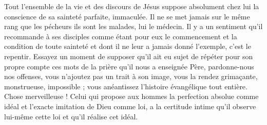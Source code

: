 Tout l’ensemble de la vie et des discours de Jésus suppose absolument chez lui la conscience de sa sainteté parfaite, immaculée.
Il ne se met jamais sur le même rang que les pécheurs\frcolon{} ils sont les malades, lui le médecin.
Il y a un sentiment qu’il recommande à ses disciples comme étant pour eux le commencement et la condition de toute sainteté et dont il ne leur a jamais donné l’exemple, c’est le repentir. Essayez un moment de supposer qu’il ait eu sujet de répéter pour son propre compte ces mots de la prière qu’il nous a enseignée\frcolon{} \Og{} Père, pardonne-nous nos offenses\Fg{}, vous n’ajoutez pas un trait à son image, vous la rendez grimaçante, monstrueuse, impossible ; vous anéantissez l’histoire évangélique tout entière. Chose merveilleuse ! Celui qui propose aux hommes la perfection absolue comme idéal et l’exacte imitation de Dieu comme loi, a la certitude intime qu’il observe lui-même cette loi et qu’il réalise cet idéal.

